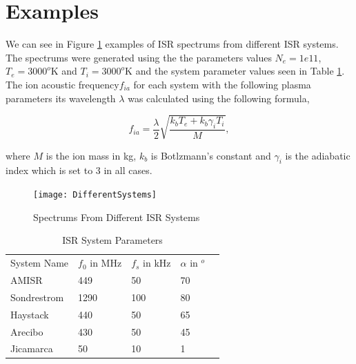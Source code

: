 \documentclass[10pt]{report}
\begin{document}
\section{Examples}
We can see in Figure \ref{fig:diffspectrums} examples of ISR spectrums from different ISR systems. The spectrums were generated using the the parameters values $N_e=1e11$, $T_e=3000^o$K and $T_i=3000^o$K and the system parameter values seen in Table \ref{tab:ISRsys}. The ion acoustic frequency$f_{ia}$ for each system with the following plasma parameters its wavelength $\lambda$ was calculated using the following formula,

\begin{equation}
\label{eq:iaf}
f_{ia} = \frac{\lambda}{2}\sqrt{\frac{k_bT_e +k_b\gamma_iT_i}{M}},
\end{equation}

\noindent where $M$ is the ion mass in kg, $k_b$ is Botlzmann's constant and $\gamma_i$ is the adiabatic index which is set to 3 in all cases.
\begin{figure}[!h]
\centering
\texttt{[image: DifferentSystems]}

\caption{Spectrums From Different ISR Systems}
\label{fig:diffspectrums}
\end{figure}

\begin{table}[!h]
\centering
\caption{ISR System Parameters}
\label{tab:ISRsys}
\begin{tabular}{lllll}
System Name & $f_0$ in MHz & $f_s$ in kHz & $\alpha$ in $^o$ &  \\
AMISR       & 449          & 50           & 70               &  \\
Sondrestrom & 1290         & 100          & 80               &  \\
Haystack    & 440          & 50           & 65               &  \\
Arecibo     & 430          & 50           & 45               &  \\
Jicamarca   & 50           & 10           & 1                & 
\end{tabular}
\end{table}
\end{document}

